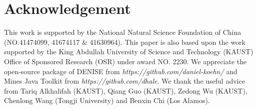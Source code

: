 \section{Acknowledgement}
This work is supported by the
National Natural Science Foundation of China (NO.41474099, 41674117 \& 41630964). 
This paper is also based upon the work supported by the King Abdullah University of Science
and Technology (KAUST) Office of Sponsored Research (OSR) under award NO. 2230.
We appreciate the open-source package of DENISE from
\textit{https://github.com/daniel-koehn/} and Mines Java Toolkit from
\textit{https://github.com/dhale}.
We thank the useful advice from Tariq Alkhalifah (KAUST), Qiang Guo (KAUST), Zedong Wu (KAUST),
Chenlong Wang (Tongji University) and Benxin Chi (Los Alamos).
\clearpage
\begin{figure}[h]
   \centering
   \\

\end{figure}
